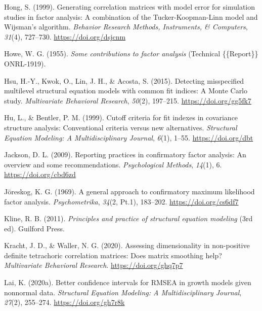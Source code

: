 \documentclass[11pt]{umnthesis}
\newlength{\cslhangindent}
\newenvironment{CSLReferences}[2] %
 {%
  \setlength{\parindent}{0pt}
  \ifodd #1 \everypar{\setlength{\hangindent}{\cslhangindent}}\ignorespaces\fi
  \ifnum #2 > 0
  \setlength{\parskip}{#2\baselineskip}
  \fi
 }%
 {}
\begin{document}
\begin{CSLReferences}{1}{0}
\leavevmode{}%
Hong, S. (1999). Generating correlation matrices with model error for simulation studies in factor analysis: {A} combination of the {Tucker-Koopman-Linn} model and {Wijsman}'s algorithm. \emph{Behavior Research Methods, Instruments, \& Computers}, \emph{31}(4), 727--730. \url{https://doi.org/dsjcnm}

\leavevmode{}%
Howe, W. G. (1955). \emph{Some contributions to factor analysis} (Technical \{\{Report\}\} ONRL-1919).

\leavevmode{}%
Hsu, H.-Y., Kwok, O., Lin, J. H., \& Acosta, S. (2015). Detecting misspecified multilevel structural equation models with common fit indices: {A Monte Carlo} study. \emph{Multivariate Behavioral Research}, \emph{50}(2), 197--215. \url{https://doi.org/gg5fk7}

\leavevmode{}%
Hu, L., \& Bentler, P. M. (1999). Cutoff criteria for fit indexes in covariance structure analysis: {Conventional} criteria versus new alternatives. \emph{Structural Equation Modeling: A Multidisciplinary Journal}, \emph{6}(1), 1--55. \url{https://doi.org/dbt}

\leavevmode{}%
Jackson, D. L. (2009). Reporting practices in confirmatory factor analysis: {An} overview and some recommendations. \emph{Psychological Methods}, \emph{14}(1), 6. \url{https://doi.org/cbd6zd}

\leavevmode{}%
Jöreskog, K. G. (1969). A general approach to confirmatory maximum likelihood factor analysis. \emph{Psychometrika}, \emph{34}(2, Pt.1), 183--202. \url{https://doi.org/cs6df7}

\leavevmode{}%
Kline, R. B. (2011). \emph{Principles and practice of structural equation modeling} (3rd ed). {Guilford Press}.

\leavevmode{}%
Kracht, J. D., \& Waller, N. G. (2020). Assessing dimensionality in non-positive definite tetrachoric correlation matrices: {Does} matrix smoothing help? \emph{Multivariate Behavioral Research}. \url{https://doi.org/ghq7p7}

\leavevmode{}%
Lai, K. (2020a). Better confidence intervals for {RMSEA} in growth models given nonnormal data. \emph{Structural Equation Modeling: A Multidisciplinary Journal}, \emph{27}(2), 255--274. \url{https://doi.org/gh7r8k}


\end{CSLReferences}
\end{document}
